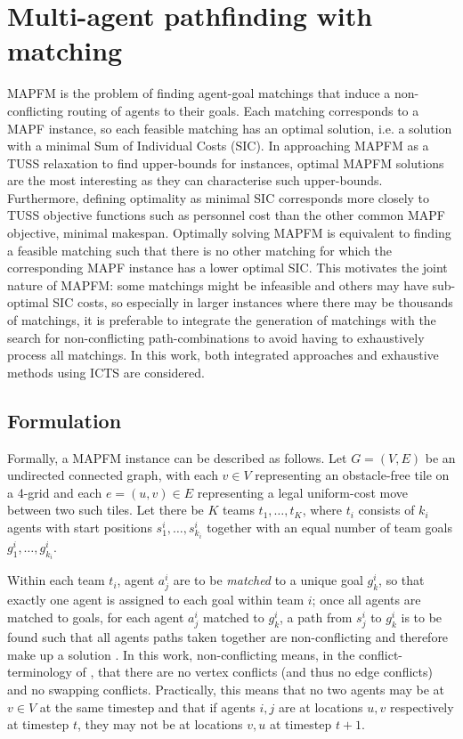 \documentclass[english]{article}
\begin{document}
	\section{Multi-agent pathfinding with matching} %
	MAPFM is the problem of finding agent-goal matchings that induce a non-conflicting routing of agents to their goals. Each matching corresponds to a MAPF instance, so each feasible matching has an optimal solution, i.e. a solution with a minimal Sum of Individual Costs (SIC). In approaching MAPFM as a TUSS relaxation to find upper-bounds for instances, optimal MAPFM solutions are the most interesting as they can characterise such upper-bounds. Furthermore, defining optimality as minimal SIC corresponds more closely to TUSS objective functions such as personnel cost than the other common MAPF objective, minimal makespan. Optimally solving MAPFM is equivalent to finding a feasible matching such that there is no other matching for which the corresponding MAPF instance has a lower optimal SIC. This motivates the joint nature of MAPFM: some matchings might be infeasible and others may have sub-optimal SIC costs, so especially in larger instances where there may be thousands of matchings, it is preferable to integrate the generation of matchings with the search for non-conflicting path-combinations to avoid having to exhaustively process all matchings. In this work, both integrated approaches and exhaustive methods using ICTS are considered.
	
	\subsection{Formulation}
	Formally, a MAPFM instance can be described as follows. Let $G = (V,E)$ be an undirected connected graph, with each $v\in V$ representing an obstacle-free tile on a 4-grid and each $e = (u,v)\in E$ representing a legal uniform-cost move between two such tiles. Let there be $K$ teams $t_1,\ldots, t_K$, where $t_i$ consists of $k_i$ agents with start positions $s_1^i,\ldots,s_{k_i}^i$ together with an equal number of team goals $g_1^i,\ldots,g_{k_i}^i$. 
	
	Within each team $t_i$, agent $a_j^i$ are to be \textit{matched} to a unique goal $g_k^i$, so that exactly one agent is assigned to each goal within team $i$; once all agents are matched to goals, for each agent $a_j^i$ matched to $g_k^i$, a path from $s_j^i$ to $g_k^i$ is to be found such that all agents paths taken together are non-conflicting and therefore make up a solution \cite{ma2016}. In this work, non-conflicting means, in the conflict-terminology of \cite{stern2019}, that there are no vertex conflicts (and thus no edge conflicts) and no swapping conflicts. Practically, this means that no two agents may be at $v\in V$ at the same timestep and that if agents $i,j$ are at locations $u,v$ respectively at timestep $t$, they may not be at locations $v,u$ at timestep $t+1$. 
	
\end{document}
